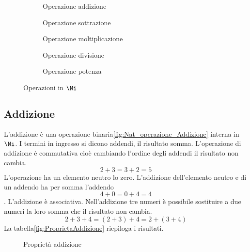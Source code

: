 \begin{figure} 
\begin{subfigure}[b]{.5\linewidth}
		\centering

	\caption{Operazione addizione}
	\label{fig:Nat_operazione_Addizione}
\end{subfigure}%
\begin{subfigure}[b]{.5\linewidth}
	\centering

	\caption{Operazione sottrazione}
	\label{fig:Nat_operazione_Sottrazione}
\end{subfigure}
	\begin{subfigure}[b]{.5\linewidth}
	\centering

	\caption{Operazione moltiplicazione}
	\label{fig:Nat_operazione_Moltiplicazione}
	\end{subfigure}
	\begin{subfigure}[b]{.5\linewidth}
	\centering

	\caption{Operazione divisione}
	\label{fig:Nat_operazione_Divisione}
	\end{subfigure}
		\begin{subfigure}[b]{.5\linewidth}
		\centering
	
		\caption{Operazione potenza}
		\label{fig:Nat_operazione_Potenza}
		\end{subfigure}
	\caption{Operazioni in $\Ni$}
	\label{fig:OperazioniinN}
\end{figure}
\subsection{Addizione}
\label{sec:NumerinatADD}
L'addizione è una operazione binaria\nobs\vref{fig:Nat_operazione_Addizione}  interna in $\Ni$. I termini in ingresso si dicono addendi, il risultato somma. L'operazione di  addizione è commutativa cioè cambiando l'ordine degli addendi il risultato non cambia. \[2+3=3+2=5\] L'operazione ha un elemento neutro lo zero. L'addizione dell'elemento neutro e di un addendo ha per somma l'addendo  \[4+0=0+4=4\]. L'addizione è associativa. Nell'addizione tre numeri è possibile sostituire a due numeri la loro somma che il risultato non  cambia.\[2+3+4=(2+3)+4=2+(3+4)\] La tabella\nobs\vref{fig:ProprietaAddizione} riepiloga i risultati.
\begin{figure} %
	\centering

	\caption{Proprietà addizione}
	\label{fig:ProprietaAddizione}\end{figure}
